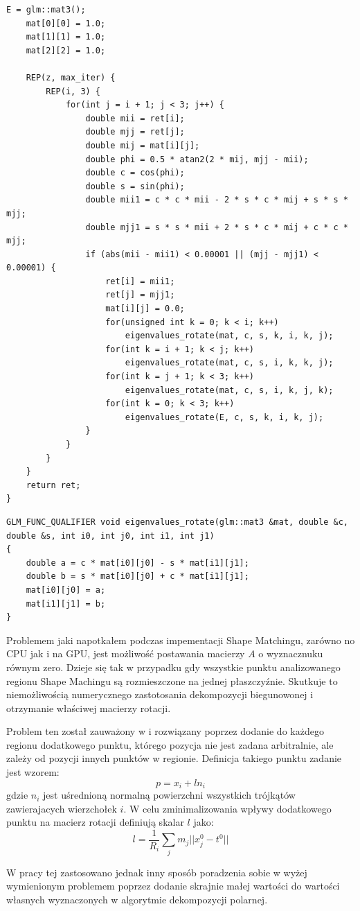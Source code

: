 {\begin{lstlisting}[caption=Algorytm wyznaczania wartości i wektorów własnych
	macierzy,label=eigenvalues]
	E = glm::mat3();
	mat[0][0] = 1.0;
	mat[1][1] = 1.0;
	mat[2][2] = 1.0;

	REP(z, max_iter) {
		REP(i, 3) {
			for(int j = i + 1; j < 3; j++) {
				double mii = ret[i];
				double mjj = ret[j];
				double mij = mat[i][j];
				double phi = 0.5 * atan2(2 * mij, mjj - mii);
				double c = cos(phi);
				double s = sin(phi);
				double mii1 = c * c * mii - 2 * s * c * mij + s * s * mjj;
				double mjj1 = s * s * mii + 2 * s * c * mij + c * c * mjj;
				if (abs(mii - mii1) < 0.00001 || (mjj - mjj1) < 0.00001) {
					ret[i] = mii1;
					ret[j] = mjj1;
					mat[i][j] = 0.0;
					for(unsigned int k = 0; k < i; k++)
						eigenvalues_rotate(mat, c, s, k, i, k, j);
					for(int k = i + 1; k < j; k++)
						eigenvalues_rotate(mat, c, s, i, k, k, j);
					for(int k = j + 1; k < 3; k++)
						eigenvalues_rotate(mat, c, s, i, k, j, k);
					for(int k = 0; k < 3; k++)
						eigenvalues_rotate(E, c, s, k, i, k, j);
				}
			}
		}
	}
	return ret;
}
\end{lstlisting}

\begin{lstlisting}[caption=Algorytm dekompozycji biegunowej
	macierzy,label=eigen-rotate]
GLM_FUNC_QUALIFIER void eigenvalues_rotate(glm::mat3 &mat, double &c, double &s, int i0, int j0, int i1, int j1)
{
	double a = c * mat[i0][j0] - s * mat[i1][j1];
	double b = s * mat[i0][j0] + c * mat[i1][j1];
	mat[i0][j0] = a;
	mat[i1][j1] = b;
}
\end{lstlisting}

Problemem jaki napotkałem podczas impementacji Shape Matchingu, zarówno no CPU
jak i na GPU, jest możliwość postawania macierzy $A$ o wyznacznuku równym zero.
Dzieje się tak w przypadku gdy wszystkie punktu analizowanego regionu Shape
Machingu są rozmieszczone na jednej płaszczyźnie. Skutkuje to niemożliwością
numerycznego zastotosania dekompozycji biegunowonej i otrzymanie właściwej
macierzy rotacji.

Problem ten został zauważony w \cite{diziol} i rozwiązany poprzez dodanie do
każdego regionu dodatkowego punktu, którego pozycja nie jest zadana arbitralnie,
	ale zależy od pozycji innych punktów w regionie. Definicja takiego punktu
	zadanie jest wzorem:
	$$ p = x_i + l n_i$$
	gdzie $n_i$ jest uśrednioną normalną powierzchni wszystkich trójkątów
	zawierajacych wierzchołek $i$. W celu zminimalizowania wpływy dodatkowego
	punktu na macierz rotacji \cite{diziol} definiują skalar $l$ jako:
	$$ l = \frac{1}{R_i}\sum_j m_j || x^0_j - t^0||$$

	W pracy tej zastosowano jednak inny sposób poradzenia sobie w wyżej
	wymienionym problemem poprzez dodanie skrajnie małej wartości do wartości
	własnych wyznaczonych w algorytmie dekompozycji polarnej.

}
